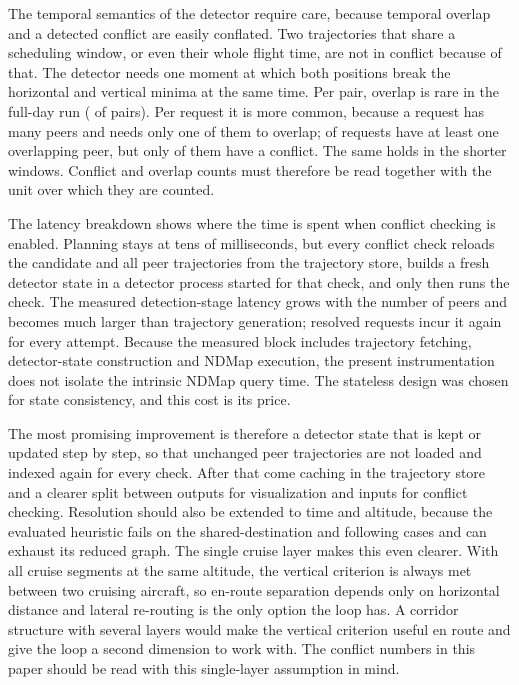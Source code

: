 The temporal semantics of the detector require care, because temporal overlap and a detected conflict are easily conflated. Two trajectories that share a scheduling window, or even their whole flight time, are not in conflict because of that. The detector needs one moment at which both positions break the horizontal and vertical minima at the same time. Per pair, overlap is rare in the full-day run (\cfOverlapPairs{} of \cfComparisons{} pairs). Per request it is more common, because a request has many peers and needs only one of them to overlap; \cfWithOverlap{} of \cfWithPeers{} requests have at least one overlapping peer, but only \cfConflicted{} of them have a conflict. The same holds in the shorter windows. Conflict and overlap counts must therefore be read together with the unit over which they are counted.

The latency breakdown shows where the time is spent when conflict checking is enabled. Planning stays at tens of milliseconds, but every conflict check reloads the candidate and all peer trajectories from the trajectory store, builds a fresh detector state in a detector process started for that check, and only then runs the check. The measured detection-stage latency grows with the number of peers and becomes much larger than trajectory generation; resolved requests incur it again for every attempt. Because the measured block includes trajectory fetching, detector-state construction and NDMap execution, the present instrumentation does not isolate the intrinsic NDMap query time. The stateless design was chosen for state consistency, and this cost is its price.

The most promising improvement is therefore a detector state that is kept or updated step by step, so that unchanged peer trajectories are not loaded and indexed again for every check. After that come caching in the trajectory store and a clearer split between outputs for visualization and inputs for conflict checking. Resolution should also be extended to time and altitude, because the evaluated heuristic fails on the shared-destination and following cases and can exhaust its reduced graph. The single cruise layer makes this even clearer. With all cruise segments at the same altitude, the vertical criterion is always met between two cruising aircraft, so en-route separation depends only on horizontal distance and lateral re-routing is the only option the loop has. A corridor structure with several layers would make the vertical criterion useful en route and give the loop a second dimension to work with. The conflict numbers in this paper should be read with this single-layer assumption in mind.

